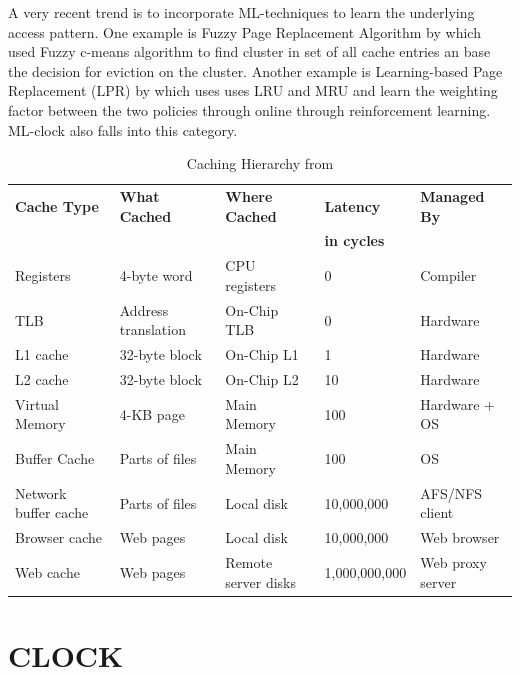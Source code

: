 \documentclass[
	12pt,
	a4paper,
	abstract,
	bibliography=totoc,
	chapterprefix,
	headings=openright,
	numbers=endperiod,
	parskip=half,
	twoside,
]{scrreprt}
\begin{document}
A very recent trend is to incorporate ML-techniques to learn the underlying access pattern.
One example is Fuzzy Page Replacement Algorithm by \cite{akbari2020page}
which used Fuzzy c-means algorithm to find cluster in set of all cache entries an base the decision for eviction on the cluster.
Another example is Learning-based Page Replacement (LPR) by \cite{kim2022lpr} which uses 
uses LRU and MRU and learn the weighting factor between the two policies through online through reinforcement learning.
ML-clock also falls into this category.


\begin{table}[ht]
	\centering
	\begin{tabular}{|l|l|l|l|l|}
		\hline
		\textbf{Cache Type} & \textbf{What Cached} & \textbf{Where Cached} & \textbf{Latency} & \textbf{Managed By}\\
		 &  &  & \textbf{in cycles} &  \\
		\hline
		\hline
		Registers & 4-byte word & CPU registers & 0 & Compiler \\
		\hline
		TLB & Address translation & On-Chip TLB & 0 & Hardware \\
		\hline
		L1 cache & 32-byte block & On-Chip L1 & 1 & Hardware \\
		\hline
		L2 cache & 32-byte block & On-Chip L2 & 10 & Hardware \\
		\hline
		Virtual Memory & 4-KB page & Main Memory & 100 & Hardware + OS \\
		\hline
		Buffer Cache & Parts of files & Main Memory & 100 & OS \\
		\hline
		Network buffer cache & Parts of files & Local disk & 10,000,000 & AFS/NFS client \\
		\hline
		Browser cache & Web pages & Local disk & 10,000,000 & Web browser \\
		\hline
		Web cache & Web pages & Remote server disks & 1,000,000,000 & Web proxy server \\
		\hline
	\end{tabular}
	\caption{Caching Hierarchy from \cite{7569243}}
	\label{tab:caching hierarchy}
\end{table}



\section{CLOCK}
\end{document}
